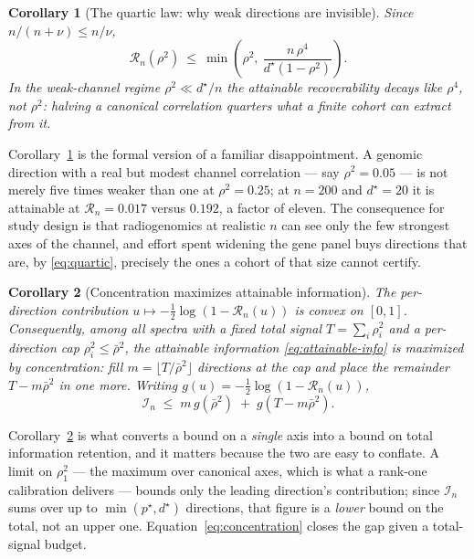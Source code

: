 \documentclass{article}
\newtheorem{corollary}{Corollary}
\begin{document}
\begin{corollary}[The quartic law: why weak directions are invisible]
\label{cor:quartic}
Since $n/(n+\nu)\le n/\nu$,
\begin{equation}
\mathcal{R}_n(\rho^2)\ \le\ \min\!\left(\rho^2,\ \frac{n\,\rho^4}{d^\star(1-\rho^2)}\right).
\label{eq:quartic}
\end{equation}
In the weak-channel regime $\rho^2\ll d^\star/n$ the attainable recoverability
decays like $\rho^4$, not $\rho^2$: halving a canonical correlation quarters
what a finite cohort can extract from it.
\end{corollary}

Corollary~\ref{cor:quartic} is the formal version of a familiar disappointment.
A genomic direction with a real but modest channel correlation --- say
$\rho^2=0.05$ --- is not merely five times weaker than one at $\rho^2=0.25$; at
$n=200$ and $d^\star=20$ it is attainable at $\mathcal{R}_n=0.017$ versus
$0.192$, a factor of eleven. The consequence for study design is that
radiogenomics at realistic $n$ can see only the few strongest axes of the
channel, and effort spent widening the gene panel buys directions that are, by
\eqref{eq:quartic}, precisely the ones a cohort of that size cannot certify.

\begin{corollary}[Concentration maximizes attainable information]
\label{cor:concentration}
The per-direction contribution $u \mapsto -\tfrac12\log(1-\mathcal{R}_n(u))$ is
convex on $[0,1]$. Consequently, among all spectra with a fixed total signal
$T = \sum_i \rho_i^2$ and a per-direction cap $\rho_i^2 \le \bar\rho^2$, the
attainable information \eqref{eq:attainable-info} is maximized by
\emph{concentration}: fill $m = \lfloor T/\bar\rho^2 \rfloor$ directions at the
cap and place the remainder $T - m\bar\rho^2$ in one more. Writing
$g(u) = -\tfrac12\log(1-\mathcal{R}_n(u))$,
\begin{equation}
\mathcal{I}_n \;\le\; m\,g(\bar\rho^2) \;+\; g\!\left(T - m\bar\rho^2\right).
\label{eq:concentration}
\end{equation}
\end{corollary}

Corollary~\ref{cor:concentration} is what converts a bound on a \emph{single}
axis into a bound on total information retention, and it matters because the two
are easy to conflate. A limit on $\rho_1^2$ --- the maximum over canonical axes,
which is what a rank-one calibration delivers --- bounds only the leading
direction's contribution; since $\mathcal{I}_n$ sums over up to
$\min(p^\star,d^\star)$ directions, that figure is a \emph{lower} bound on the
total, not an upper one. Equation~\eqref{eq:concentration} closes the gap given a
total-signal budget.
\end{document}
